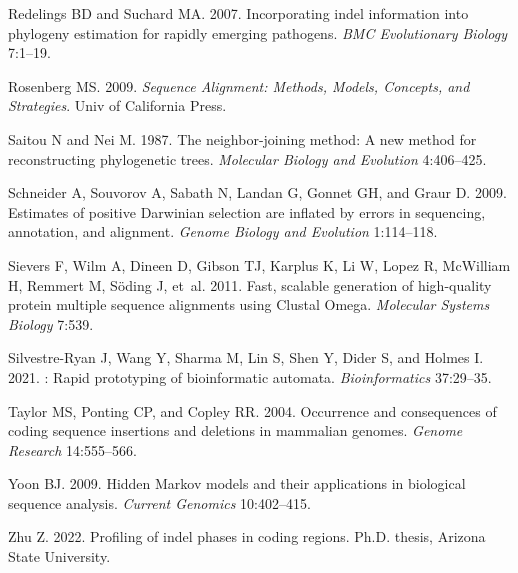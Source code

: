 \documentclass[12pt,letterpaper]{article}
\begin{document}
\begin{thebibliography}{44}
Redelings BD and Suchard MA. 2007.
\newblock Incorporating indel information into phylogeny estimation for rapidly
  emerging pathogens.
\newblock \emph{BMC Evolutionary Biology} 7:1--19.

Rosenberg MS. 2009.
\newblock \emph{Sequence Alignment: Methods, Models, Concepts, and Strategies}.
\newblock Univ of California Press.

Saitou N and Nei M. 1987.
\newblock The neighbor-joining method: A new method for reconstructing
  phylogenetic trees.
\newblock \emph{Molecular Biology and Evolution} 4:406--425.

Schneider A, Souvorov A, Sabath N, Landan G, Gonnet GH, and Graur D. 2009.
\newblock Estimates of positive {Darwinian} selection are inflated by errors in
  sequencing, annotation, and alignment.
\newblock \emph{Genome Biology and Evolution} 1:114--118.

Sievers F, Wilm A, Dineen D, Gibson TJ, Karplus K, Li W, Lopez R, McWilliam H,
  Remmert M, S{\"o}ding J, et~al. 2011.
\newblock Fast, scalable generation of high-quality protein multiple sequence
  alignments using {Clustal Omega}.
\newblock \emph{Molecular Systems Biology} 7:539.

Silvestre-Ryan J, Wang Y, Sharma M, Lin S, Shen Y, Dider S, and Holmes I. 2021.
: Rapid prototyping of bioinformatic automata.
\newblock \emph{Bioinformatics} 37:29--35.

Taylor MS, Ponting CP, and Copley RR. 2004.
\newblock Occurrence and consequences of coding sequence insertions and
  deletions in mammalian genomes.
\newblock \emph{Genome Research} 14:555--566.

Yoon BJ. 2009.
\newblock Hidden {Markov} models and their applications in biological sequence
  analysis.
\newblock \emph{Current Genomics} 10:402--415.

Zhu Z. 2022.
\newblock Profiling of indel phases in coding regions.
\newblock Ph.D. thesis, Arizona State University.

\end{thebibliography}

\nolinenumbers
\end{document}
